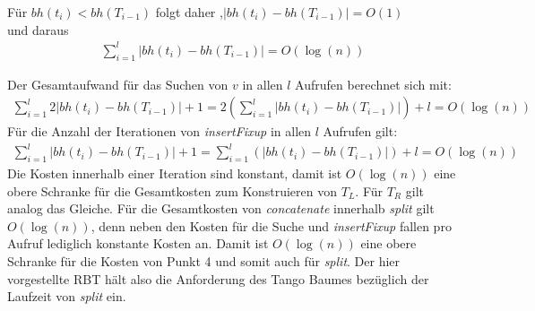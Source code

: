 \documentclass[a4paper,12pt]{article}
\begin{document}
 

\noindent Für $\mathit{bh} \left(t_{i} \right) < \mathit{bh} \left(T_{i-1} \right)$ folgt daher  ,$\vert\mathit{bh} \left(t_{i} \right) -\mathit{bh} \left(T_{i-1} \right) \vert = O\left(1\right) $ \\ und daraus
\begin{align*}
\sum_{i = 1}^{l} \vert\mathit{bh} \left(t_{i} \right) -\mathit{bh} \left(T_{i-1} \right) \vert =  O \left(\log \left(n \right) \right) 
\end{align*}


\noindent Der Gesamtaufwand für das Suchen von $v$ in allen $l$ Aufrufen berechnet sich mit: 
\begin{align*}
\sum_{i = 1}^{l}  2 \vert\mathit{bh}(t_{i}) -\mathit{bh}(T_{i-1}) \vert + 1 =
2 \left( \sum_{i = 1}^{l}   \vert\mathit{bh}(t_{i}) -\mathit{bh}(T_{i-1}) \vert \right)+ l
= O \left(\log \left(n \right) \right)
\end{align*}
\noindent Für die Anzahl der Iterationen von \textit{insertFixup} in allen $l$ Aufrufen gilt: 
\begin{align*}
\sum_{i = 1}^{l}   \vert\mathit{bh}(t_{i}) -\mathit{bh}(T_{i-1}) \vert +1 =
\sum_{i = 1}^{l}  \left( \vert\mathit{bh}(t_{i}) -\mathit{bh}(T_{i-1}) \vert \right) + l 
= O \left(\log \left(n \right) \right)
\end{align*}
Die Kosten innerhalb einer Iteration sind konstant, damit ist  $O \left(\log \left(n \right) \right)$ eine obere Schranke für die Gesamtkosten zum Konstruieren von $T_L$. Für $T_R$ gilt analog das Gleiche. Für die Gesamtkosten von \textit{concatenate} innerhalb \textit{split} gilt $O \left(\log \left(n \right) \right)$, denn neben den Kosten für die Suche und \textit{insertFixup} fallen pro Aufruf lediglich konstante Kosten an. Damit ist $O \left(\log \left(n \right) \right)$ eine obere Schranke für die Kosten von Punkt 4 und somit auch für \textit{split}. Der hier vorgestellte RBT hält also die Anforderung des Tango Baumes bezüglich der Laufzeit von \textit{split} ein.
\end{document}
